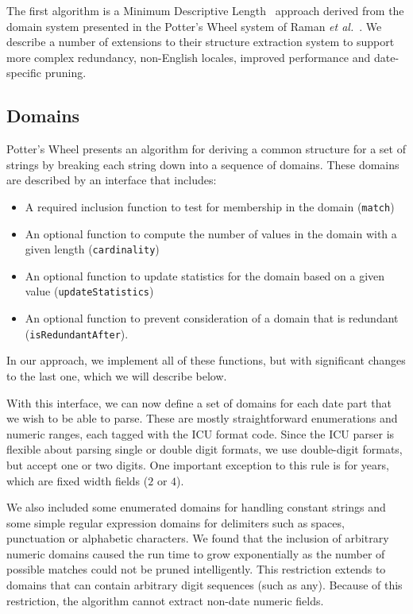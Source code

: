 The first algorithm is a Minimum Descriptive Length~\cite{Rissanen:1978} approach derived from the domain system presented in the Potter's Wheel system of Raman \textit{et al.}~\cite{Raman:2001}. We describe a number of extensions to their structure extraction system to support more complex redundancy, non-English locales, improved performance and date-specific pruning.

\subsection{Domains}
Potter's Wheel presents an algorithm for deriving a common structure for a set of strings by breaking each string down into a sequence of domains. These domains are described by an interface that includes:
\begin{itemize}
\item A required inclusion function to test for membership in the domain (\texttt{match})
\item An optional function to compute the number of values in the domain with a given length (\texttt{cardinality})
\item An optional function to update statistics for the domain based on a given value (\texttt{updateStatistics})
\item An optional function to prevent consideration of a domain that is redundant (\texttt{isRedundantAfter}).
\end{itemize}

In our approach, we implement all of these functions, but with significant changes to the last one, which we will describe below.

With this interface, we can now define a set of domains for each date part that we wish to be able to parse. These are mostly straightforward enumerations and numeric ranges, each tagged with the ICU format code. Since the ICU parser is flexible about parsing single or double digit formats, we use double-digit formats, but accept one or two digits. One important exception to this rule is for years, which are fixed width fields ($2$ or $4$).

We also included some enumerated domains for handling constant strings and some simple regular expression domains for delimiters such as spaces, punctuation or alphabetic characters. We found that the inclusion of arbitrary numeric domains caused the run time to grow exponentially as the number of possible matches could not be pruned intelligently. This restriction extends to domains that can contain arbitrary digit sequences (such as any). Because of this restriction, the algorithm cannot extract non-date numeric fields.

